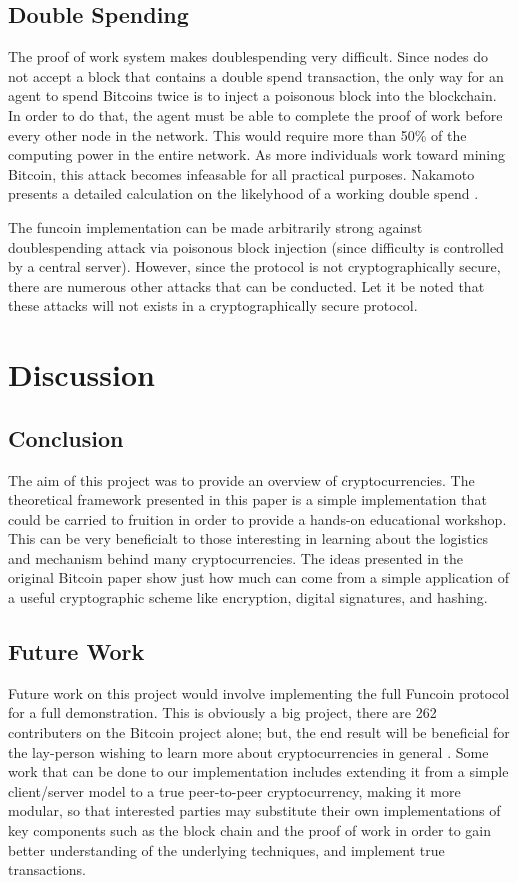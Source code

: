 \documentclass[12pt]{article}
\begin{document}
\subsection{Double Spending}\label{doublespend}
The proof of work system makes doublespending very difficult. Since nodes do not accept a block that contains a double spend transaction, the only way for an agent to spend Bitcoins twice is to inject a poisonous block into the blockchain. In order to do that, the agent must be able to complete the proof of work before every other node in the network. This would require more than 50\% of the computing power in the entire network. As more individuals work toward mining Bitcoin, this attack becomes infeasable for all practical purposes. Nakamoto presents a detailed calculation on the likelyhood of a working double spend \cite{nakamoto:bitcoin}.

The funcoin implementation can be made arbitrarily strong against doublespending attack via poisonous block injection (since difficulty is controlled by a central server). However, since the protocol is not cryptographically secure, there are numerous other attacks that can be conducted. Let it be noted that these attacks will not exists in a cryptographically secure protocol.

\section{Discussion}\label{future}
\subsection{Conclusion}
The aim of this project was to provide an overview of cryptocurrencies. The theoretical framework presented in this paper is a simple implementation that could be carried to fruition in order to provide a hands-on educational workshop. This can be very beneficialt to those interesting in learning about the logistics and mechanism behind many cryptocurrencies. The ideas presented in the original Bitcoin paper show just how much can come from a simple application of a useful cryptographic scheme like encryption, digital signatures, and hashing. 

\subsection{Future Work}\label{work}
Future work on this project would involve implementing the full Funcoin protocol for a full demonstration. This is obviously a big project, there are 262 contributers on the Bitcoin project alone; but, the end result will be beneficial for the lay-person wishing to learn more about cryptocurrencies in general
.
Some work that can be done to our implementation includes extending it from a simple client/server model to a true peer-to-peer cryptocurrency, making it more modular, so that interested parties may substitute their own implementations of key components such as the block chain and the proof of work in order to gain better understanding of the underlying techniques, and implement true transactions. 
\end{document}
